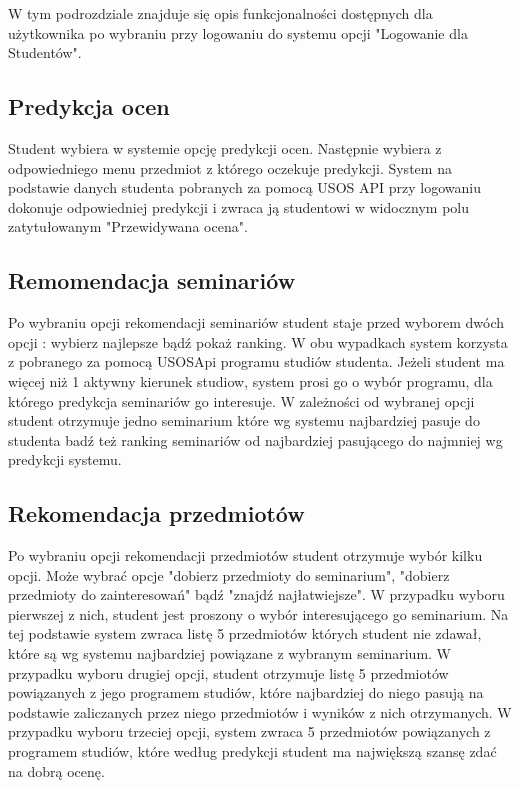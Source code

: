 \documentclass[licencjacka]{pracamgr}
\begin{document}
W tym podrozdziale znajduje się opis funkcjonalności dostępnych dla użytkownika po wybraniu przy logowaniu do systemu opcji "Logowanie dla Studentów".

\subsection{Predykcja ocen}

Student wybiera w systemie opcję predykcji ocen. Następnie wybiera z odpowiedniego menu przedmiot z którego oczekuje predykcji. System na podstawie danych studenta pobranych za pomocą USOS API przy logowaniu dokonuje odpowiedniej predykcji i zwraca ją studentowi w widocznym polu zatytułowanym "Przewidywana ocena".

\subsection{Remomendacja seminariów}

Po wybraniu opcji rekomendacji seminariów student staje przed wyborem dwóch opcji : wybierz najlepsze bądź pokaż ranking. W obu wypadkach system korzysta z pobranego za pomocą USOSApi programu studiów studenta. Jeżeli student ma więcej niż 1 aktywny kierunek studiow, system prosi go o wybór programu, dla którego predykcja seminariów go interesuje. W zależności od wybranej opcji student otrzymuje jedno seminarium które wg systemu najbardziej pasuje do studenta badź też ranking seminariów od najbardziej pasującego do najmniej wg predykcji systemu.

\subsection{Rekomendacja przedmiotów}
Po wybraniu opcji rekomendacji przedmiotów student otrzymuje wybór kilku opcji. Może wybrać opcje "dobierz przedmioty do seminarium", "dobierz przedmioty do zainteresowań" bądź "znajdź najłatwiejsze". W przypadku wyboru pierwszej z nich, student jest proszony o wybór interesującego go seminarium. Na tej podstawie system zwraca listę 5 przedmiotów których student nie zdawał, które są wg systemu najbardziej powiązane z wybranym seminarium. W przypadku wyboru drugiej opcji, student otrzymuje listę 5 przedmiotów powiązanych z jego programem studiów, które najbardziej do niego pasują na podstawie zaliczanych przez niego przedmiotów i wyników z nich otrzymanych. W przypadku wyboru trzeciej opcji, system zwraca 5 przedmiotów powiązanych z programem studiów, które według predykcji student ma największą szansę zdać na dobrą ocenę.
\end{document}
